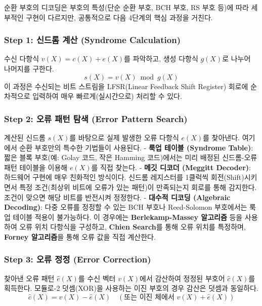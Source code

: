 \documentclass[
  oneside]{article}
\begin{document}
순환 부호의 디코딩은 부호의 특성(단순 순환 부호, BCH 부호, RS 부호 등)에
따라 세부적인 구현이 다르지만, 공통적으로 다음 4단계의 핵심 과정을
거친다.

\subsubsection{Step 1: 신드롬 계산 (Syndrome
Calculation)}\label{step-1-uxc2e0uxb4dcuxb86c-uxacc4uxc0b0-syndrome-calculation}

수신 다항식 \(v(X) = c(X) + e(X)\)를 파악하고, 생성 다항식 \(g(X)\)로
나누어 나머지를 구한다. \[s(X) = v(X) \bmod g(X)\] 이 과정은 수신되는
비트 스트림을 LFSR(Linear Feedback Shift Register) 회로에 순차적으로
입력하여 매우 빠르게(실시간으로) 처리할 수 있다.

\subsubsection{Step 2: 오류 패턴 탐색 (Error Pattern
Search)}\label{step-2-uxc624uxb958-uxd328uxd134-uxd0d0uxc0c9-error-pattern-search}

계산된 신드롬 \(s(X)\)를 바탕으로 실제 발생한 오류 다항식 \(e(X)\)를
찾아낸다. 여기에서 순환 부호만의 특수한 기법들이 사용된다. -
\textbf{룩업 테이블 (Syndrome Table)}: 짧은 블록 부호(예: Golay 코드,
작은 Hamming 코드)에서는 미리 배정된 신드롬-오류 패턴 테이블을 이용해
\(e(X)\)를 직접 찾는다. - \textbf{메깃 디코더 (Meggitt Decoder)}:
하드웨어 구현에 매우 친화적인 방식이다. 신드롬 레지스터를 1클럭씩
회전(Shift)시키면서 특정 조건(최상위 비트에 오류가 있는 패턴)이
만족되는지 회로를 통해 감지한다. 조건이 맞으면 해당 비트를 반전시켜
정정한다. - \textbf{대수적 디코딩 (Algebraic Decoding)}: 다중 오류를
정정할 수 있는 BCH 부호나 Reed-Solomon 부호에서는 룩업 테이블 적용이
불가능하다. 이 경우에는 \textbf{Berlekamp-Massey 알고리즘} 등을 사용하여
오류 위치 다항식을 구성하고, \textbf{Chien Search}를 통해 오류 위치를
특정하며, \textbf{Forney 알고리즘}을 통해 오류 값을 직접 계산한다.

\subsubsection{Step 3: 오류 정정 (Error
Correction)}\label{step-3-uxc624uxb958-uxc815uxc815-error-correction}

찾아낸 오류 패턴 \(\hat{e}(X)\)를 수신 벡터 \(v(X)\)에서 감산하여 정정된
부호어 \(\hat{c}(X)\)를 획득한다. 모듈로-2 덧셈(XOR)을 사용하는 이진
부호의 경우 감산은 덧셈과 동일하다.
\[\hat{c}(X) = v(X) - \hat{e}(X) \quad (\text{또는 이진 체에서 } v(X) + \hat{e}(X))\]
\end{document}
